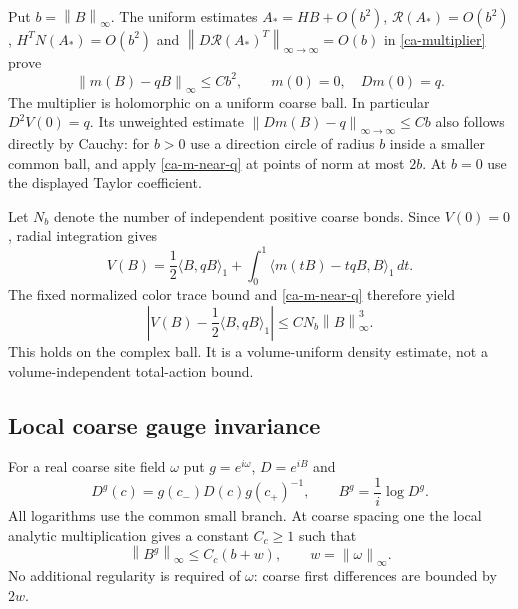 \documentclass[11pt]{article}
\theoremstyle{remark}
\newcommand{\norm}[1]{\left\|#1\right\|}
\begin{document}
Put $b=\norm{B}_\infty$. The uniform estimates
$A_*=HB+O(b^2)$, $\mathcal R(A_*)=O(b^2)$,
$H^TN(A_*)=O(b^2)$ and
$\norm{D\mathcal R(A_*)^T}_{\infty\to\infty}=O(b)$
in \eqref{ca-multiplier} prove
\begin{equation}\label{ca-m-near-q}
 \norm{m(B)-qB}_\infty\le Cb^2,
 \qquad m(0)=0,\quad Dm(0)=q.
\end{equation}
The multiplier is holomorphic on a uniform coarse ball.
In particular $D^2V(0)=q$. Its unweighted estimate
$\norm{Dm(B)-q}_{\infty\to\infty}\le Cb$ also follows
directly by Cauchy: for $b>0$ use a direction circle of radius
$b$ inside a smaller common ball, and apply
\eqref{ca-m-near-q} at points of norm at most $2b$.
At $b=0$ use the displayed Taylor coefficient.

Let $N_b$ denote the number of independent positive coarse
bonds. Since $V(0)=0$, radial integration gives
\begin{equation}\label{ca-radial}
 V(B)=\frac12\langle B,qB\rangle_1
       +\int_0^1\langle m(tB)-tqB,B\rangle_1\,dt.
\end{equation}
The fixed normalized color trace bound and
\eqref{ca-m-near-q} therefore yield
\begin{equation}\label{ca-cubic-remainder}
 \boxed{\quad
 \left|V(B)-\frac12\langle B,qB\rangle_1\right|
          \le C N_b\norm{B}_\infty^3.
 \quad}
\end{equation}
This holds on the complex ball. It is a volume-uniform
density estimate, not a volume-independent total-action bound.

\subsection{Local coarse gauge invariance}
\label{ca-gauge-section}

For a real coarse site field $\omega$ put $g=e^{i\omega}$,
$D=e^{iB}$ and
\begin{equation}\label{ca-coarse-gauge}
 D^g(c)=g(c_-)D(c)g(c_+)^{-1},\qquad
 B^g=\frac1i\log D^g.
\end{equation}
All logarithms use the common small branch. At coarse spacing
one the local analytic multiplication gives a constant
$C_c\ge1$ such that
\begin{equation}\label{ca-coarse-gauge-bound}
 \norm{B^g}_\infty\le C_c(b+w),\qquad
 w=\norm{\omega}_\infty.
\end{equation}
No additional regularity is required of $\omega$: coarse
first differences are bounded by $2w$.
\end{document}
